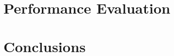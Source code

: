 \documentclass{article}
\begin{document}
\section{Performance Evaluation}
\label{sec:perf_eval}

\section{Conclusions}
\label{sec:conclusion}


	

% 
% 
\end{document}
